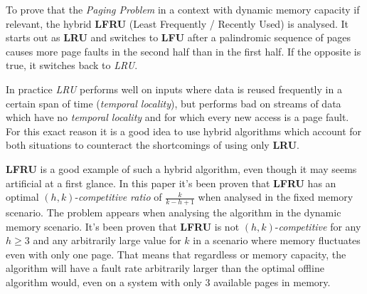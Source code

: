 To prove that the \emph{Paging Problem} in a context with dynamic memory
capacity if relevant, the hybrid \textbf{LFRU} (Least Frequently / Recently
Used) is analysed. It starts out as \textbf{LRU} and switches to \textbf{LFU}
after a palindromic sequence of pages causes more page faults in the second
half than in the first half. If the opposite is true, it switches back to
\emph{LRU}.

In practice \emph{LRU} performs well on inputs where data is reused
frequently in a certain span of time (\emph{temporal locality}), but performs 
bad on streams of data which have no \emph{temporal locality} and for which
every new access is a page fault. For this exact reason it is a good idea 
to use hybrid algorithms which account for both situations to counteract the
shortcomings of using only \textbf{LRU}.

\textbf{LFRU} is a good example of such a hybrid algorithm, even though it may
seems artificial at a first glance. In this paper it's been proven that
\textbf{LFRU} has an optimal $(h, k)$-\emph{competitive ratio} of $\frac{k}{k -
h + 1}$ when analysed in the fixed memory scenario. The problem appears when
analysing the algorithm in the dynamic memory scenario. It's been proven that
\textbf{LFRU} is not $(h, k)$-\emph{competitive} for any $h \ge 3$ and any
arbitrarily large value for $k$ in a scenario where memory fluctuates even with
only one page. That means that regardless or memory capacity, the algorithm
will have a fault rate arbitrarily larger than the optimal offline algorithm
would, even on a system with only $3$ available pages in memory.

